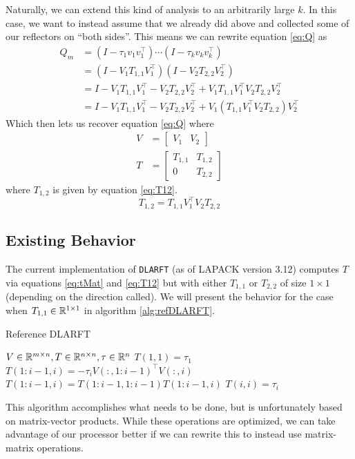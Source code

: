 \documentclass[12pt]{article}
\begin{document}
    Naturally, we can extend this kind of analysis to an arbitrarily large $k$. In this case, we want to
    instead assume that we already did above and collected some of our reflectors on ``both sides''. This means
    we can rewrite equation \ref{eq:Q} as
    \begin{align*}
        Q_m &= \left(I-\tau_1v_1v_1^\top\right)\cdots\left(I-\tau_kv_kv_k^\top\right) \\
            &= \left(I - V_1T_{1,1}V_1^\top\right)\left(I - V_2T_{2,2}V_2^\top\right) \\
            &= I - V_1T_{1,1}V_1^\top - V_2T_{2,2}V_2^\top + V_1T_{1,1}V_1^\top V_2T_{2,2}V_2^\top \\
            &= I - V_1T_{1,1}V_1^\top - V_2T_{2,2}V_2^\top + V_1\left(T_{1,1}V_1^\top V_2T_{2,2}\right)V_2^\top
    \end{align*}
    Which then lets us recover equation \ref{eq:Q} where
    \begin{align}
        V &= \begin{bmatrix} V_1 & V_2 \end{bmatrix} \label{eq:vMat} \\
        T &= \begin{bmatrix} T_{1,1} & T_{1,2} \\
        0 & T_{2,2}\end{bmatrix} \label{eq:tMat}
    \end{align}
    where $T_{1,2}$ is given by equation \ref{eq:T12}.
    \begin{equation}\label{eq:T12}
        T_{1,2} = T_{1,1}V_1^\top V_2T_{2,2}
    \end{equation}


    \subsection{Existing Behavior}
    The current implementation of \verb|DLARFT| (as of LAPACK version 3.12) computes $T$ via equations 
    \ref{eq:tMat} and \ref{eq:T12} but with either $T_{1,1}$ or $T_{2,2}$ of size $1\times 1$ (depending on the direction called). We will present the behavior for the case when $T_{1,1}\in\mathbb{R}^{1\times 1}$ in algorithm \ref{alg:refDLARFT}.

    \begin{algorithm}
        \caption{Reference DLARFT}\label{alg:refDLARFT}
        \begin{algorithmic}[1]
            \REQUIRE $V\in\mathbb{R}^{m\times n}, T\in\mathbb{R}^{n\times n}, \tau\in\mathbb{R}^{n}$ \hfill{}
            \STATE $T(1,1) = \tau_1$
                \STATE $T(1:i-1,i) = -\tau_iV(:,1:i-1)^\top V(:,i)$
                \STATE $T(1:i-1,i) = T(1:i-1,1:i-1)T(1:i-1,i)$
                \STATE $T(i,i) = \tau_i$
            \ENDFOR
        \end{algorithmic}
    \end{algorithm}
    This algorithm accomplishes what needs to be done, but is unfortunately based on matrix-vector products.
    While these operations are optimized, we can take advantage of our processor better if we can rewrite this
    to instead use matrix-matrix operations.
\end{document}
